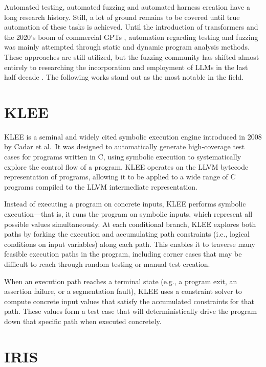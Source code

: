 \documentclass[
  a4paper,
]{scrreprt}
\theoremstyle{definition}
\theoremstyle{remark}
\begin{document}
Automated testing, automated fuzzing and automated harness creation have
a long research history. Still, a lot of ground remains to be covered
until true automation of these tasks is achieved. Until the introduction
of transformers \autocite{vaswani2023} and the 2020's boom of commercial
GPTs \autocite{chatgpt}, automation regarding testing and fuzzing was
mainly attempted through static and dynamic program analysis methods.
These approaches are still utilized, but the fuzzing community has
shifted almost entirely to researching the incorporation and employment
of LLMs in the last half decade
\autocite{iris,sun2024,prophetfuzz,oss-fuzz-gen,green2022,utopia,fuzzgpt,titanfuzz,fuzzgen,fudge}.
The following works stand out as the most notable in the field.

\section{KLEE}\label{klee}

KLEE \autocite{klee} is a seminal and widely cited symbolic execution
engine introduced in 2008 by Cadar et al.~It was designed to
automatically generate high-coverage test cases for programs written in
C, using symbolic execution to systematically explore the control flow
of a program. KLEE operates on the LLVM \autocite{llvm} bytecode
representation of programs, allowing it to be applied to a wide range of
C programs compiled to the LLVM intermediate representation.

Instead of executing a program on concrete inputs, KLEE performs
symbolic execution---that is, it runs the program on symbolic inputs,
which represent all possible values simultaneously. At each conditional
branch, KLEE explores both paths by forking the execution and
accumulating path constraints (i.e., logical conditions on input
variables) along each path. This enables it to traverse many feasible
execution paths in the program, including corner cases that may be
difficult to reach through random testing or manual test creation.

When an execution path reaches a terminal state (e.g., a program exit,
an assertion failure, or a segmentation fault), KLEE uses a constraint
solver to compute concrete input values that satisfy the accumulated
constraints for that path. These values form a test case that will
deterministically drive the program down that specific path when
executed concretely.

\section{IRIS}\label{iris}
\end{document}

